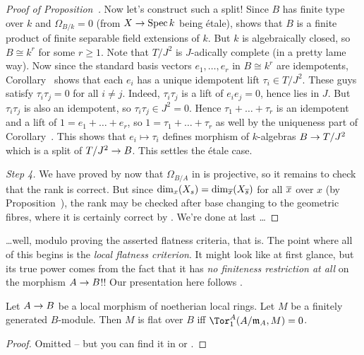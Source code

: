 \documentclass[a4paper,parskip=half,numbers=enddot, DIV=12]{scrreprt}
\renewcommand{\geq}{\geqslant}
\begin{document}
\begin{proof}[Proof of Proposition~]
	Now let's construct such a split! Since $B$ has finite type over $k$ and $\Omega_{B/k}=0$ (from $X\morphism\Spec k$ being étale), \cite[Corollary~16.16]{eisenbudCommAlg} shows that $B$ is a finite product of finite separable field extensions of $k$. But $k$ is algebraically closed, so $B\cong k^r$ for some $r\geq 1$. Note that $T/J^2$ is $J$-adically complete (in a pretty lame way). Now since the standard basis vectors $e_1,\ldots,e_r$ in $B\cong k^r$ are idempotents, Corollary~ shows that each $e_i$ has a unique idempotent lift $\tau_i\in T/J^2$. These guys satisfy $\tau_i\tau_j=0$ for all $i\neq j$. Indeed, $\tau_i\tau_j$ is a lift of $e_ie_j=0$, hence lies in $J$. But $\tau_i\tau_j$ is also an idempotent, so $\tau_i\tau_j\in J^2=0$. Hence $\tau_1+\ldots+\tau_r$ is an idempotent and a lift of $1=e_1+\ldots+e_r$, so $1=\tau_1+\ldots+\tau_r$ as well by the uniqueness part of Corollary~. This shows that $e_i\mapsto \tau_i$ defines morphism of $k$-algebras $B\morphism T/J^2$ which is a split of $T/J^2\morphism B$. This settles the étale case.
	
	\emph{Step 4.} We have proved by now that $\Omega_{B/A}$ in  is projective, so it remains to check that the rank is correct. But since $\dim_x(X_s)=\dim_{\overline{x}}(X_{\overline{s}})$ for all $\overline{x}$ over $x$ (by Proposition~), the rank may be checked after base changing to the geometric fibres, where it is certainly correct by \cite[Proposition~1.6.3]{alg2}. We're done at last \ldots
\end{proof}
\ldots well, modulo proving the asserted flatness criteria, that is. The point where all of this begins is the \emph{local flatness criterion}. It might look like \cite[Proposition~1.3.1]{homalg} at first glance, but its true power comes from the fact that it has \emph{no finiteness restriction at all} on the morphism $A\morphism B$!! Our presentation here follows \cite[]{stacks-project}.
\begin{prop}
	Let $A\morphism B$ be a local morphism of noetherian local rings. Let $M$ be a finitely generated $B$-module. Then $M$ is flat over $B$ iff $\Tor_1^A(A/\mm_A,M)=0$.
\end{prop}
\begin{proof}
	Omitted -- but you can find it in \cite[Theorem~6.8]{eisenbudCommAlg} or \cite[]{stacks-project}.
\end{proof}
\end{document}
